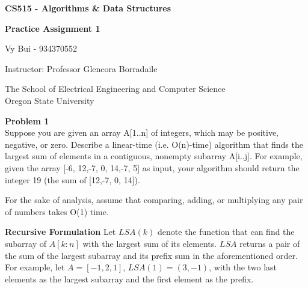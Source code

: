\documentclass[12pt,article]{article}
\newenvironment{problem}[2][Problem]
    { \begin{mdframed}[backgroundcolor=gray!20] \textbf{#1 #2} \\}
    {  \end{mdframed}}
\begin{document}
\begin{titlepage}
    \begin{center}
        \vspace*{4cm}

        \textbf{\Large CS515 - Algorithms \& Data Structures}

        \vspace{0.5cm}
 
        \textbf{\Large Practice Assignment 1}
 
        \vspace{1cm}

        Vy Bui - 934370552

        \vspace{2cm}

        Instructor: Professor Glencora Borradaile
        \vfill
             
        \vspace{0.8cm}
      
             
        The School of Electrical Engineering and Computer Science\\
        Oregon State University\\
             
    \end{center}
\end{titlepage}

\begin{problem}{1} 
Suppose you are given an array A[1..n] of integers, which may be positive, negative, or zero. Describe a linear-time (i.e. O(n)-time) algorithm that finds the largest sum of elements in a contiguous, nonempty subarray A[i..j]. For example, given the array [-6, 12,-7, 0, 14,-7, 5] as input, your algorithm should return the integer 19 (the sum of [12,-7, 0, 14]).

For the sake of analysis, assume that comparing, adding, or multiplying any pair of numbers takes O(1) time.

\end{problem}

\textbf{Recursive Formulation}
Let $LSA(k)$ denote the function that can find the subarray of $A[k:n]$ with the largest sum of its elements. $LSA$ returns a pair of the sum of the largest subarray and its prefix sum in the aforementioned order. For example, let $A = [-1,2,1]$, $LSA(1) = (3,-1)$, with the two last elements as the largest subarray and the first element as the prefix. 
\end{document}
